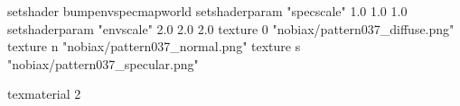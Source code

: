 setshader bumpenvspecmapworld
setshaderparam "specscale" 1.0 1.0 1.0
setshaderparam "envscale"  2.0 2.0 2.0
   texture 0 "nobiax/pattern037_diffuse.png"
   texture n "nobiax/pattern037_normal.png"
   texture s "nobiax/pattern037_specular.png"

texmaterial 2
